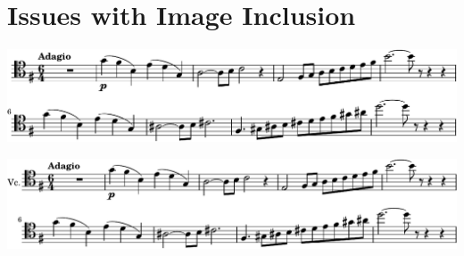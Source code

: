\documentclass{scrartcl}
\begin{document}
\section{Issues with Image Inclusion}

\Blindtext[1]

\includegraphics{media/cygne-solo}

\Blindtext[1]

\includegraphics{media/cygne-solo-with-name}

\Blindtext[1]
\end{document}
